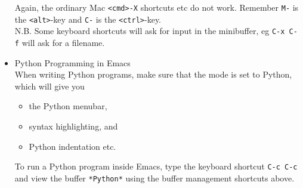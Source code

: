 \documentclass[a4,landscape]{seminar}
\begin{document}
\begin{slide}
\begin{itemize}
    Again, the ordinary Mac \texttt{<cmd>-X} shortcuts etc do not
    work. Remember \texttt{M-} is the \texttt{<alt>}-key and
    \texttt{C-} is the \texttt{<ctrl>}-key.\\[1ex]
    N.B. Some keyboard shortcuts will ask for input in the minibuffer, eg \texttt{C-x C-f} will ask for a filename.
    \clearpage{}
  \item Python Programming in Emacs\\[1ex]
    When writing Python programs, make sure that the mode is set to
    Python, which will give you
    \begin{itemize}
    \item the Python menubar,
    \item syntax highlighting, and
    \item Python indentation etc.
    \end{itemize}
    To run a Python program inside Emacs, type the keyboard shortcut
    \texttt{C-c C-c} and view the buffer \texttt{*Python*} using the
    buffer management shortcuts above.
  \end{itemize}
\end{slide}
\end{document}
